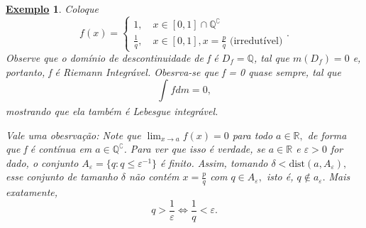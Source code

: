 \documentclass{article}
\newtheorem{example}{\underline{Exemplo}}
\begin{document}
\begin{example}
  Coloque 
    \[
      f(x) = \left\{\begin{array}{ll}
          1,\quad x\in [0, 1]\cap \mathbb{Q}^{\complement}\\
          \frac{1}{q},\quad x\in[0,1], x = \frac{p}{q}\text{ (irredutível)}
        \end{array}\right..
    \]
    Observe que o domínio de descontinuidade de f é \(D_f = \mathbb{Q}\), tal que \(m(D_{f}) = 0\) e, portanto, f é Riemann Integrável. Obesrva-se que f = 0 quase sempre, tal que 
      \[
        \int_{}f dm = 0,
      \]
    mostrando que ela também é Lebesgue integrável. 

    Vale uma obesrvação: Note que \(\lim_{x\to a}f(x) = 0\) para todo \(a\in \mathbb{R},\) de forma que f é contínua em \(a\in \mathbb{Q}^{\complement}\). Para ver que isso é verdade, se \(a\in \mathbb{R}\) e \(\varepsilon > 0\) for dado, 
    o conjunto \(A_{\varepsilon } = \{q: q \leq \varepsilon^{-1}\}\) é finito. Assim, tomando \(\delta  < \mathrm{dist}(a, A_{\varepsilon }),\) esse conjunto de tamanho \(\delta \) não contém \(x = \frac{p}{q}\) com \(q\in A_{\varepsilon },\) isto é, 
    \(q\not\in a_{\varepsilon }.\) Mais exatamente, 
      \[
        q > \frac{1}{\varepsilon } \Longleftrightarrow \frac{1}{q} < \varepsilon .
      \]
\end{example}
\end{document}
